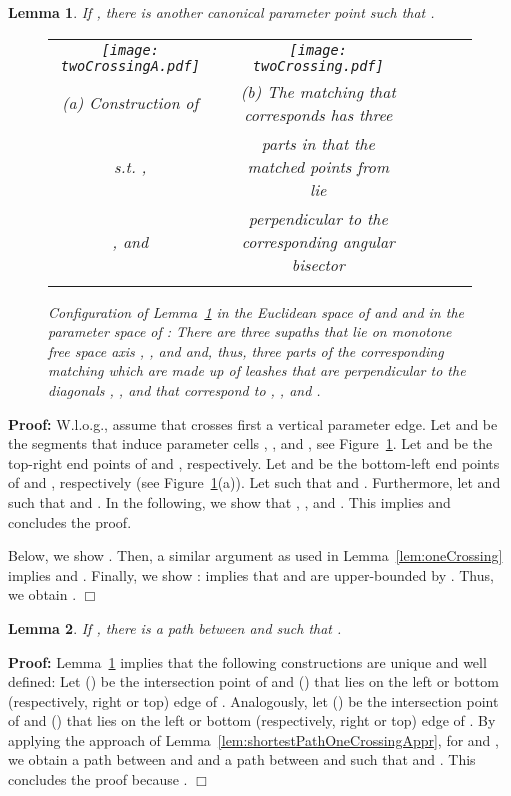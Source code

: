 \documentclass[a4paper,11pt]{article}
\newtheorem{lemma}{Lemma}
\newenvironment{proof}{\textbf{Proof:}}{\hspace*{0mm}\hfill\ensuremath{\Box}}
\begin{document}
\begin{lemma}\label{lem:twoCrossing}
	If , there is another canonical parameter point  such that .
	
\begin{figure}[ht]
  \begin{center}
    \begin{tabular}{ccccccc}
      \texttt{[image: twoCrossingA.pdf]} & &
       \texttt{[image: twoCrossing.pdf]}&&\\ 
{\small (a) Construction of } & &
      {\small (b) The matching that corresponds  has three}&&\\
      {\small s.t. ,}& &
      {\small parts in that the matched points from  lie}&&\\
      {\small , and}&&
      {\small perpendicular to the corresponding angular bisector}&&\\
      {\small }&&
      {\small }&&
    \end{tabular}
  \end{center}
  \vspace*{-12pt}
  \caption{Configuration of Lemma~\ref{lem:twoCrossing} in the Euclidean space of  and  and in the parameter space of : There are three supaths  that lie on monotone free space axis , , and  and, thus, three parts of the corresponding matching which are made up of leashes that are perpendicular to the diagonals , , and  that correspond to , , and .}
  \label{fig:twoCrossing}
\end{figure}

\end{lemma}
\begin{proof}
	W.l.o.g., assume that  crosses first a vertical parameter edge. Let  and  be the segments that induce  parameter cells , , and , see Figure~\ref{fig:twoCrossing}. Let  and  be the top-right end points of  and , respectively. Let   and  be the bottom-left end points of  and , respectively (see Figure~\ref{fig:twoCrossing}(a)). Let  such that  and . Furthermore, let  and  such that  and . In the following, we show that , , and . This implies  and concludes the proof.
	
	
	Below, we show . Then, a similar argument as used in Lemma~\ref{lem:oneCrossing} implies  and .
	Finally, we show :  implies that  and  are upper-bounded by . Thus, we obtain .
\end{proof}

\begin{lemma}\label{lem:shortestPathTwoCrossingApprSimplie}
	If , there is a path  between  and  such that .
\end{lemma}
\begin{proof}
	Lemma~\ref{lem:twoCrossing} implies that the following constructions are unique and well defined: Let  () be the intersection point of  and  () that lies on the left or bottom (respectively, right or top) edge of . Analogously, let  () be the intersection point of  and  () that lies on the left or bottom (respectively, right or top) edge of .  
	 By applying the approach of Lemma~\ref{lem:shortestPathOneCrossingAppr}, for  and , we obtain a path  between  and  and a path  between  and  such that  and .
	This concludes the proof because .
\end{proof}
\end{document}
